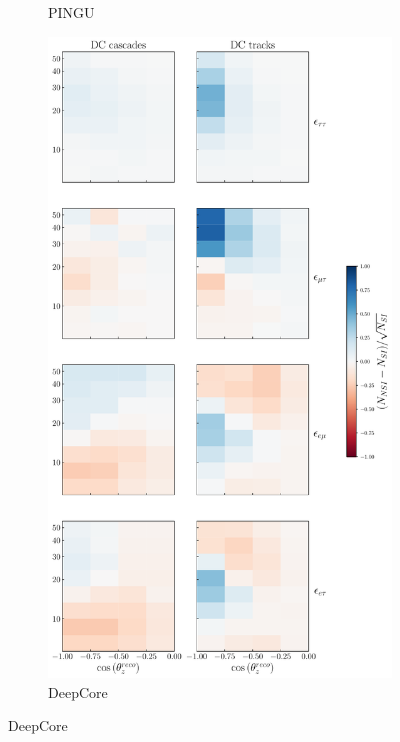 {{\begin{figure}[t]
\begin{center}
\begin{subfigure}{0.47\textwidth}
         \caption{PINGU}\label{fig:PINGU_event_pulls}
      \end{subfigure}
      \begin{subfigure}{0.51\textwidth}
         \includegraphics[width=1\linewidth]{figures/DC_event_pulls.pdf}
         \caption{DeepCore}\label{fig:DC_event_pulls}
      \end{subfigure}
    \end{center}

\end{figure}}}
